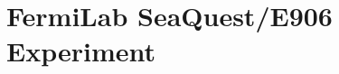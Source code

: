 \documentclass[12pt, xcolor={dvipsnames}, aspectratio = 169, sans, mathserif]{beamer}
\newenvironment{List}[2]
{\begin{textblock}{#1}#2
\begin{itemize}}
{\end{itemize}
\end{textblock}}
\newenvironment{Pic}[2]
{\begin{textblock}{#1}#2
\begin{figure}}
{\end{figure}
\end{textblock}}
\newcommand{\NewCaption}[3]{\caption{{#1}, \textcolor{blue}{\href{#2}{#3}}}}
\begin{document}
%
%
%
%

\section{FermiLab SeaQuest/E906 Experiment}
\end{document}
